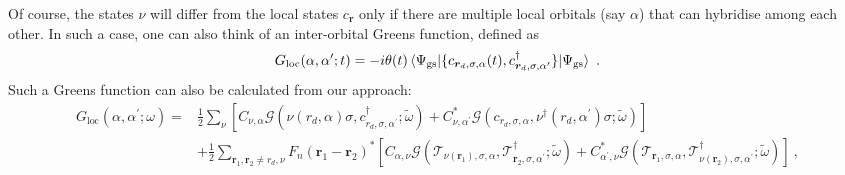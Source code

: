 Of course, the states \(\nu\) will differ from the local states \(c_{\bm r}\) only if there are multiple local orbitals (say \(\alpha\)) that can hybridise among each other. In such a case, one can also think of an inter-orbital Greens function, defined as
\begin{equation}\begin{aligned}
	G_\text{loc}(\alpha,\alpha^\prime; t) = -i\theta(t) \braket{\Psi_\text{gs} | \{ c_{{\bm r_d},\sigma,\alpha}(t), c^\dagger_{{\bm r_d},\sigma,\alpha^\prime} \} | \Psi_\text{gs}}~.
\end{aligned}\end{equation}
Such a Greens function can also be calculated from our approach:
\begin{equation}\begin{aligned}\label{interorbital}
	G_\text{loc}(\alpha,\alpha^\prime;\omega) =& \frac{1}{2}\sum_\nu \left[C_{\nu,\alpha} \mathcal{G}(\nu(r_d,\alpha)\sigma, c^\dagger_{r_d,\sigma,\alpha^\prime}; \tilde\omega) + C^*_{\nu,\alpha^\prime} \mathcal{G}(c_{r_d,\sigma,\alpha}, \nu^\dagger(r_d,\alpha^\prime)\sigma; \tilde\omega)\right] \\
						  &+ \frac{1}{2}\sum_{\bm r_1,\bm r_2 \neq r_d, \nu} F_n(\bm r_1 - \bm r_2)^* \left[C_{\alpha, \nu} \mathcal{G}(\mathcal{T}_{\nu(\bm r_1),\sigma,\alpha},\mathcal{T}^\dagger_{\bm r_2,\sigma,\alpha^\prime}; \tilde\omega) + C^*_{\alpha^\prime, \nu} \mathcal{G}(\mathcal{T}_{\bm r_1,\sigma,\alpha},\mathcal{T}^\dagger_{\nu(\bm r_2),\sigma,\alpha^\prime}; \tilde\omega)\right]~,
\end{aligned}\end{equation}




